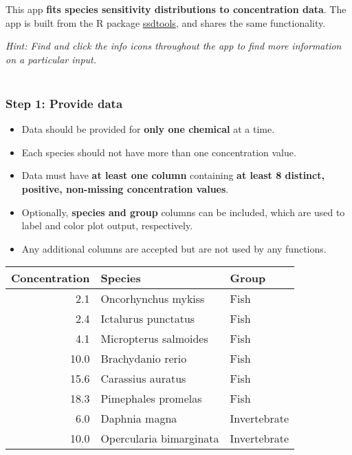 \documentclass[]{article}
\title{}
\author{}
\date{}
\providecommand{\tightlist}{%
  \setlength{\itemsep}{0pt}\setlength{\parskip}{0pt}}
\begin{document}
{
\setcounter{tocdepth}{2}
\tableofcontents
}
This app \textbf{fits species sensitivity distributions to concentration
data}. The app is built from the R package
\href{https://github.com/bcgov/ssdtools}{ssdtools}, and shares the same
functionality.

\emph{Hint: Find and click the info icons throughout the app to find
more information on a particular input.}\\
~\\

\hypertarget{step-1-provide-data}{%
\subsubsection{Step 1: Provide data}\label{step-1-provide-data}}

\begin{itemize}
\tightlist
\item
  Data should be provided for \textbf{only one chemical} at a time.
\item
  Each species should not have more than one concentration value.
\item
  Data must have \textbf{at least one column} containing \textbf{at
  least 8 distinct, positive, non-missing concentration values}.
\item
  Optionally, \textbf{species and group} columns can be included, which
  are used to label and color plot output, respectively.\\
\item
  Any additional columns are accepted but are not used by any functions.
\end{itemize}

\begin{table}[H]
\centering\begingroup\fontsize{11}{13}\selectfont

\begin{tabular}{r|l|l}
\hline
Concentration & Species & Group\\
\hline
2.1 & Oncorhynchus mykiss & Fish\\
\hline
2.4 & Ictalurus punctatus & Fish\\
\hline
4.1 & Micropterus salmoides & Fish\\
\hline
10.0 & Brachydanio rerio & Fish\\
\hline
15.6 & Carassius auratus & Fish\\
\hline
18.3 & Pimephales promelas & Fish\\
\hline
6.0 & Daphnia magna & Invertebrate\\
\hline
10.0 & Opercularia bimarginata & Invertebrate\\
\hline
\end{tabular}
\endgroup{}
\end{table}
\end{document}
